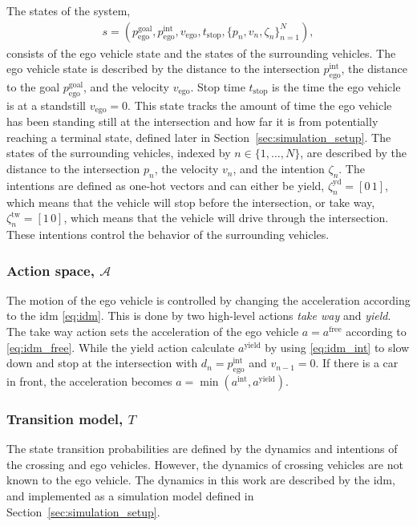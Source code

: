 The states of the system,
\begin{align}
    s = (p_\mathrm{ego}^\mathrm{goal},p_\mathrm{ego}^\mathrm{int}, v_\mathrm{ego}, t_\mathrm{stop}, \{p_{n}, v_n, \zeta_n\}_{n=1}^N),
    \label{eq:state}
\end{align}
consists of the ego vehicle state and the states of the surrounding vehicles. The ego vehicle state is described by the distance to the intersection $p_\mathrm{ego}^\mathrm{int}$, the distance to the goal $p_\mathrm{ego}^\mathrm{goal}$, and the velocity $v_\mathrm{ego}$. Stop time $t_\mathrm{stop}$ is the time the ego vehicle is at a standstill $v_\mathrm{ego}=0$. This state tracks the amount of time the ego vehicle has been standing still at the intersection and how far it is from potentially reaching a terminal state, defined later in Section~\ref{sec:simulation_setup}. The states of the surrounding vehicles, indexed by $n \in \{1, \ldots, N\}$, are described by the distance to the intersection $p_{n}$, the velocity $v_n$, and the intention $\zeta_n$. The intentions are defined as one-hot vectors and can either be yield, $\zeta_n^\mathrm{yd} = [0 \, 1]$, which means that the vehicle will stop before the intersection, or take way, $\zeta_n^\mathrm{tw}= [1 \, 0]$, which means that the vehicle will drive through the intersection. These intentions control the behavior of the surrounding vehicles.


\subsubsection{Action space, $\mathcal{A}$}
\label{sec:action}
The motion of the ego vehicle is controlled by changing the acceleration according to the \gls{idm} \eqref{eq:idm}. This is done by two high-level actions \textit{take way} and \textit{yield}. The take way action sets the acceleration of the ego vehicle $a=a^\mathrm{free}$ according to \eqref{eq:idm_free}. While the yield action calculate $a^\mathrm{yield}$ by using \eqref{eq:idm_int} to slow down and stop at the intersection with $d_n = p_\mathrm{ego}^\mathrm{int}$ and $v_{n-1}=0$. If there is a car in front, the acceleration becomes $a=\min(a^\mathrm{int},a^\mathrm{yield})$. 

\subsubsection{Transition model, $T$}
\label{sec:transition_model}
The state transition probabilities are defined by the dynamics and intentions of the crossing and ego vehicles. However, the dynamics of crossing vehicles are not known to the ego vehicle. The dynamics in this work are described by the \gls{idm}, and implemented as a simulation model defined in Section~\ref{sec:simulation_setup}. 

